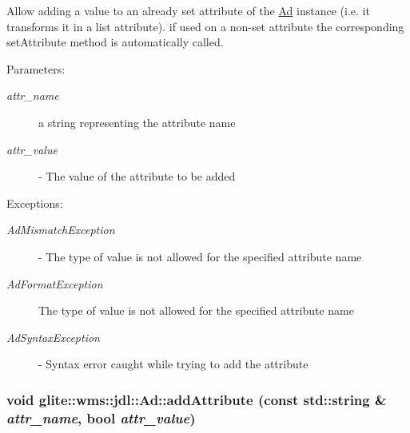 Allow adding a value to an already set attribute of the \hyperlink{classglite_1_1wms_1_1jdl_1_1Ad}{Ad} instance (i.e. it transforms it in a list attribute). if used on a non-set attribute the corresponding set\-Attribute method is automatically called. \begin{Desc}
\item[Parameters:]
\begin{description}
\item[{\em attr\_\-name}]a string representing the attribute name \item[{\em attr\_\-value}]- The value of the attribute to be added \end{description}
\end{Desc}
\begin{Desc}
\item[Exceptions:]
\begin{description}
\item[{\em Ad\-Mismatch\-Exception}]- The type of value is not allowed for the specified attribute name \item[{\em Ad\-Format\-Exception}]The type of value is not allowed for the specified attribute name \item[{\em Ad\-Syntax\-Exception}]- Syntax error caught while trying to add the attribute \end{description}
\end{Desc}
\hypertarget{classglite_1_1wms_1_1jdl_1_1Ad_z19_4}{
\subsubsection[addAttribute]{\setlength{\rightskip}{0pt plus 5cm}void glite::wms::jdl::Ad::add\-Attribute (const std::string \& {\em attr\_\-name}, bool {\em attr\_\-value})}}
\label{classglite_1_1wms_1_1jdl_1_1Ad_z19_4}


